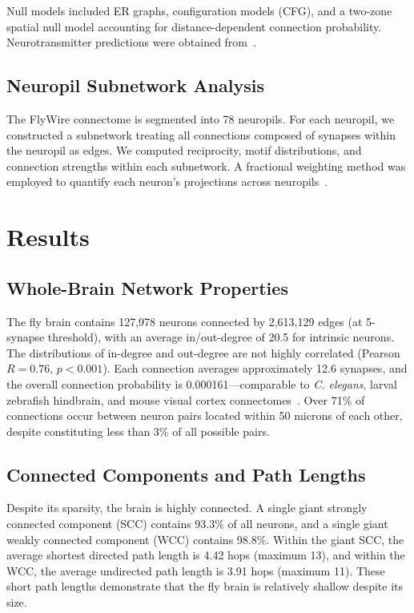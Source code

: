 \documentclass[11pt]{article}
\begin{document}
Null models included ER graphs, configuration models (CFG), and a two-zone spatial null model accounting for distance-dependent connection probability. Neurotransmitter predictions were obtained from~\citep{eckstein2023neurotransmitter}.

\subsection{Neuropil Subnetwork Analysis}

The FlyWire connectome is segmented into 78 neuropils. For each neuropil, we constructed a subnetwork treating all connections composed of synapses within the neuropil as edges. We computed reciprocity, motif distributions, and connection strengths within each subnetwork. A fractional weighting method was employed to quantify each neuron's projections across neuropils~\citep{dorkenwald2023neuronal}.

\section{Results}

\subsection{Whole-Brain Network Properties}

The fly brain contains 127,978 neurons connected by 2,613,129 edges (at 5-synapse threshold), with an average in/out-degree of 20.5 for intrinsic neurons. The distributions of in-degree and out-degree are not highly correlated (Pearson $R = 0.76$, $p < 0.001$). Each connection averages approximately 12.6 synapses, and the overall connection probability is 0.000161---comparable to \textit{C. elegans}, larval zebrafish hindbrain, and mouse visual cortex connectomes~\citep{varshney2011structural,vishwanathan2023cyclic,microns2022reconstruction}. Over 71\% of connections occur between neuron pairs located within 50 microns of each other, despite constituting less than 3\% of all possible pairs.

\subsection{Connected Components and Path Lengths}

Despite its sparsity, the brain is highly connected. A single giant strongly connected component (SCC) contains 93.3\% of all neurons, and a single giant weakly connected component (WCC) contains 98.8\%. Within the giant SCC, the average shortest directed path length is 4.42 hops (maximum 13), and within the WCC, the average undirected path length is 3.91 hops (maximum 11). These short path lengths demonstrate that the fly brain is relatively shallow despite its size.
\end{document}
